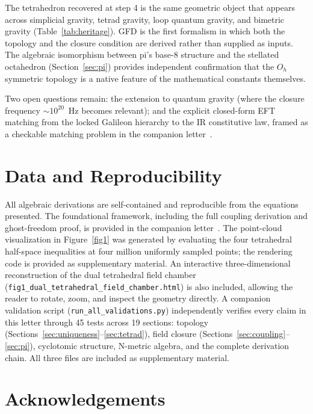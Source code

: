 \documentclass[twocolumn]{iopjournal}
\begin{document}
The tetrahedron recovered at step 4 is the same geometric object that appears across simplicial gravity, tetrad gravity, loop quantum gravity, and bimetric gravity (Table~\ref{tab:heritage}). GFD is the first formalism in which both the topology and the closure condition are derived rather than supplied as inputs. The algebraic isomorphism between pi's base-8 structure and the stellated octahedron (Section~\ref{sec:pi}) provides independent confirmation that the $O_h$ symmetric topology is a native feature of the mathematical constants themselves.

Two open questions remain: the extension to quantum gravity (where the closure frequency ${\sim}10^{20}$~Hz becomes relevant); and the explicit closed-form EFT matching from the locked Galileon hierarchy to the IR constitutive law, framed as a checkable matching problem in the companion letter~\cite{Nelson2026b}.

\section*{Data and Reproducibility}

All algebraic derivations are self-contained and reproducible from the equations presented. The foundational framework, including the full coupling derivation and ghost-freedom proof, is provided in the companion letter~\cite{Nelson2026b}. The point-cloud visualization in Figure~\ref{fig1} was generated by evaluating the four tetrahedral half-space inequalities at four million uniformly sampled points; the rendering code is provided as supplementary material. An interactive three-dimensional reconstruction of the dual tetrahedral field chamber (\texttt{fig1\_dual\_tetrahedral\_field\_chamber.html}) is also included, allowing the reader to rotate, zoom, and inspect the geometry directly. A companion validation script (\texttt{run\_all\_validations.py}) independently verifies every claim in this letter through 45 tests across 19 sections: topology (Sections~\ref{sec:uniqueness}--\ref{sec:tetrad}), field closure (Sections~\ref{sec:coupling}--\ref{sec:pi}), cyclotomic structure, N-metric algebra, and the complete derivation chain. All three files are included as supplementary material.


\section*{Acknowledgements}
\end{document}
